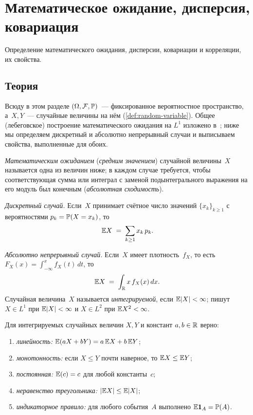 
\section{Математическое ожидание, дисперсия, ковариация}
\label{sec:1.2.03-moments}

\begin{ticket}
Определение математического ожидания, дисперсии, ковариации и корреляции, их свойства.
\end{ticket}

\subsection*{Теория}

Всюду в этом разделе $(\Omega, \mathcal{F}, \mathbb{P})$~--- фиксированное вероятностное пространство, а~$X, Y$~--- случайные величины на нём (\cref{def:random-variable}). Общее (лебеговское) построение математического ожидания на $L^1$ изложено в~\cite[гл.~II, \S~6]{Shiryaev1989}; ниже мы определяем дискретный и абсолютно непрерывный случаи и выписываем свойства, выполненные для обоих.

\begin{definition}
\label{def:expectation}
\emph{Математическим ожиданием} (\emph{средним значением}) случайной величины~$X$ называется одна из величин ниже; в каждом случае требуется, чтобы соответствующая сумма или интеграл с заменой подынтегрального выражения на его модуль был конечным (\emph{абсолютная сходимость}).

\emph{Дискретный случай.} Если~$X$ принимает счётное число значений $\{x_k\}_{k \geq 1}$ с вероятностями $p_k = \mathbb{P}(X = x_k)$, то
\[
  \mathbb{E} X \;=\; \sum_{k \geq 1} x_k\, p_k.
\]

\emph{Абсолютно непрерывный случай.} Если~$X$ имеет плотность~$f_X$, то есть $F_X(x) = \int_{-\infty}^{x} f_X(t)\, dt$, то
\[
  \mathbb{E} X \;=\; \int_{\mathbb{R}} x\, f_X(x)\, dx.
\]
Случайная величина~$X$ называется \emph{интегрируемой}, если $\mathbb{E} |X| < \infty$; пишут $X \in L^1$ при $\mathbb{E} |X| < \infty$ и $X \in L^2$ при $\mathbb{E} X^2 < \infty$.
\end{definition}

\begin{proposition}
\label{prop:exp-properties}
Для интегрируемых случайных величин $X, Y$ и констант $a, b \in \mathbb{R}$ верно:
\begin{enumerate}[label=(\alph*)]
  \item \emph{линейность:} $\mathbb{E}(aX + bY) = a\, \mathbb{E} X + b\, \mathbb{E} Y$;
  \item \emph{монотонность:} если $X \leq Y$ почти наверное, то $\mathbb{E} X \leq \mathbb{E} Y$;
  \item \emph{постоянная:} $\mathbb{E}(c) = c$ для любой константы~$c$;
  \item \emph{неравенство треугольника:} $|\mathbb{E} X| \leq \mathbb{E} |X|$;
  \item \emph{индикаторное правило:} для любого события~$A$ выполнено $\mathbb{E}\mathbf{1}_A = \mathbb{P}(A)$.
\end{enumerate}
\end{proposition}

